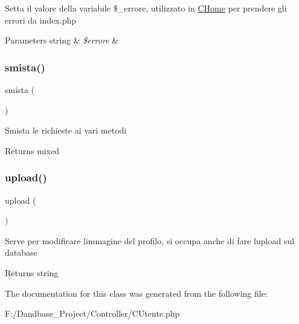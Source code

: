 Setta il valore della variabile \$\+\_\+errore, utilizzato in \mbox{\hyperlink{class_c_home}{C\+Home}} per prendere gli errori da index.\+php


\begin{DoxyParams}[1]{Parameters}
string & {\em \$errore} & \\
\hline
\end{DoxyParams}
\mbox{\label{class_c_utente_afc7ba180569cef3535974cfc4a1211f1}} 
\subsubsection{\texorpdfstring{smista()}{smista()}}
{\footnotesize\ttfamily smista (\begin{DoxyParamCaption}{ }\end{DoxyParamCaption})}

Smista le richieste ai vari metodi

\begin{DoxyReturn}{Returns}
mixed 
\end{DoxyReturn}
\mbox{\label{class_c_utente_a160ae63d11b56d3190b172facb43a343}} 
\subsubsection{\texorpdfstring{upload()}{upload()}}
{\footnotesize\ttfamily upload (\begin{DoxyParamCaption}{ }\end{DoxyParamCaption})}

Serve per modificare l\textquotesingle{}immagine del profilo, si occupa anche di fare l\textquotesingle{}upload sul database

\begin{DoxyReturn}{Returns}
string 
\end{DoxyReturn}


The documentation for this class was generated from the following file\+:\begin{DoxyCompactItemize}
\item 
F\+:/\+Dandbase\+\_\+\+Project/\+Controller/C\+Utente.\+php\end{DoxyCompactItemize}
